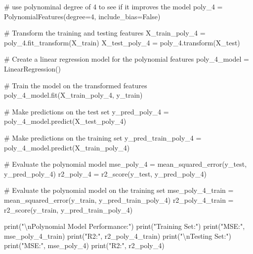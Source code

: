 \documentclass[
  letterpaper,
  DIV=11,
  numbers=noendperiod]{scrreprt}
\newenvironment{Shaded}{\begin{snugshade}}{\end{snugshade}}
\newcommand{\BuiltInTok}[1]{\textcolor[rgb]{0.00,0.23,0.31}{#1}}
\newcommand{\CharTok}[1]{\textcolor[rgb]{0.13,0.47,0.30}{#1}}
\newcommand{\CommentTok}[1]{\textcolor[rgb]{0.37,0.37,0.37}{#1}}
\newcommand{\DecValTok}[1]{\textcolor[rgb]{0.68,0.00,0.00}{#1}}
\newcommand{\NormalTok}[1]{\textcolor[rgb]{0.00,0.23,0.31}{#1}}
\newcommand{\OperatorTok}[1]{\textcolor[rgb]{0.37,0.37,0.37}{#1}}
\newcommand{\StringTok}[1]{\textcolor[rgb]{0.13,0.47,0.30}{#1}}
\newcommand{\VariableTok}[1]{\textcolor[rgb]{0.07,0.07,0.07}{#1}}
\begin{document}
\begin{Shaded}
\begin{Highlighting}[]
\CommentTok{\# use polynominal degree of 4 to see if it improves the model}
\NormalTok{poly\_4 }\OperatorTok{=}\NormalTok{ PolynomialFeatures(degree}\OperatorTok{=}\DecValTok{4}\NormalTok{, include\_bias}\OperatorTok{=}\VariableTok{False}\NormalTok{)}

\CommentTok{\# Transform the training and testing features}
\NormalTok{X\_train\_poly\_4 }\OperatorTok{=}\NormalTok{ poly\_4.fit\_transform(X\_train)}
\NormalTok{X\_test\_poly\_4 }\OperatorTok{=}\NormalTok{ poly\_4.transform(X\_test)}

\CommentTok{\# Create a linear regression model for the polynomial features}
\NormalTok{poly\_4\_model }\OperatorTok{=}\NormalTok{ LinearRegression()}

\CommentTok{\# Train the model on the transformed features}
\NormalTok{poly\_4\_model.fit(X\_train\_poly\_4, y\_train)}

\CommentTok{\# Make predictions on the test set}
\NormalTok{y\_pred\_poly\_4 }\OperatorTok{=}\NormalTok{ poly\_4\_model.predict(X\_test\_poly\_4)}

\CommentTok{\# Make predictions on the training set}
\NormalTok{y\_pred\_train\_poly\_4 }\OperatorTok{=}\NormalTok{ poly\_4\_model.predict(X\_train\_poly\_4)}

\CommentTok{\# Evaluate the polynomial model}
\NormalTok{mse\_poly\_4 }\OperatorTok{=}\NormalTok{ mean\_squared\_error(y\_test, y\_pred\_poly\_4)}
\NormalTok{r2\_poly\_4 }\OperatorTok{=}\NormalTok{ r2\_score(y\_test, y\_pred\_poly\_4)}

\CommentTok{\# Evaluate the polynomial model on the training set}
\NormalTok{mse\_poly\_4\_train }\OperatorTok{=}\NormalTok{ mean\_squared\_error(y\_train, y\_pred\_train\_poly\_4)}
\NormalTok{r2\_poly\_4\_train }\OperatorTok{=}\NormalTok{ r2\_score(y\_train, y\_pred\_train\_poly\_4)}

\BuiltInTok{print}\NormalTok{(}\StringTok{"}\CharTok{\textbackslash{}n}\StringTok{Polynomial Model Performance:"}\NormalTok{)}
\BuiltInTok{print}\NormalTok{(}\StringTok{"Training Set:"}\NormalTok{)}
\BuiltInTok{print}\NormalTok{(}\StringTok{"MSE:"}\NormalTok{, mse\_poly\_4\_train)}
\BuiltInTok{print}\NormalTok{(}\StringTok{"R2:"}\NormalTok{, r2\_poly\_4\_train)}
\BuiltInTok{print}\NormalTok{(}\StringTok{"}\CharTok{\textbackslash{}n}\StringTok{Testing Set:"}\NormalTok{)}
\BuiltInTok{print}\NormalTok{(}\StringTok{"MSE:"}\NormalTok{, mse\_poly\_4)}
\BuiltInTok{print}\NormalTok{(}\StringTok{"R2:"}\NormalTok{, r2\_poly\_4)}
\end{Highlighting}
\end{Shaded}
\end{document}
